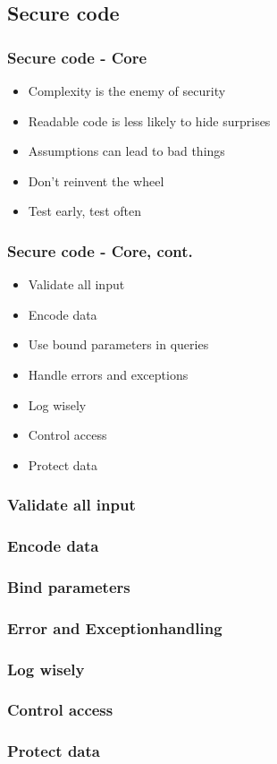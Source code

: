 \documentclass{beamer}
\begin{document}
  \subsection{Secure code}
    \begin{frame}
      \frametitle{Secure code - Core}
      \begin{itemize}
        \item Complexity is the enemy of security
        \item Readable code is less likely to hide surprises
        \item Assumptions can lead to bad things
        \item Don't reinvent the wheel
        \item Test early, test often
      \end{itemize}
    \end{frame}
    \begin{frame}
      \frametitle{Secure code - Core, cont.}
      \begin{itemize}
        \item Validate all input
        \item Encode data
        \item Use bound parameters in queries
        \item Handle errors and exceptions
        \item Log wisely
        \item Control access
        \item Protect data
      \end{itemize}
    \end{frame}
    \begin{frame}
      \frametitle{Validate all input}
    \end{frame}
    \begin{frame}
      \frametitle{Encode data}
    \end{frame}
    \begin{frame}
      \frametitle{Bind parameters}
    \end{frame}
    \begin{frame}
      \frametitle{Error and Exceptionhandling}
    \end{frame}
    \begin{frame}
      \frametitle{Log wisely}
    \end{frame}
    \begin{frame}
      \frametitle{Control access}
    \end{frame}
    \begin{frame}
      \frametitle{Protect data}
    \end{frame}
\end{document}
